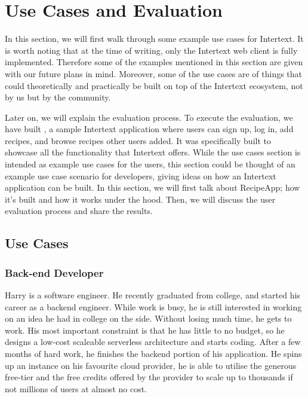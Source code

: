 
\chapter{Use Cases and Evaluation} \label{evaluation}

In this section, we will first walk through some example use cases for Intertext. It is worth noting that at the time of writing, only the Intertext web client is fully implemented. Therefore some of the examples mentioned in this section are given with our future plans in mind. Moreover, some of the use cases are of things that could theoretically and practically be built on top of the Intertext ecosystem, not by us but by the community. 

Later on, we will explain the evaluation process. To execute the evaluation, we have built , a sample Intertext application where users can sign up, log in, add recipes, and browse recipes other users added. It was specifically built to showcase all the functionality that Intertext offers. While the use cases section is intended as example use cases for the users, this section could be thought of an example use case scenario for developers, giving ideas on how an Intertext application can be built. In this section, we will first talk about RecipeApp; how it's built and how it works under the hood. Then, we will discuss the user evaluation process and share the results.

\section{Use Cases}

\subsection{Back-end Developer}

Harry is a software engineer. He recently graduated from college, and started his career as a backend engineer. While work is busy, he is still interested in working on an idea he had in college on the side. Without losing much time, he gets to work. His most important constraint is that he has little to no budget, so he designs a low-cost scaleable serverless architecture and starts coding. After a few months of hard work, he finishes the backend portion of his application. He spins up an instance on his favourite cloud provider, he is able to utilise the generous free-tier and the free credits offered by the provider to scale up to thousands if not millions of users at almost no cost. 

